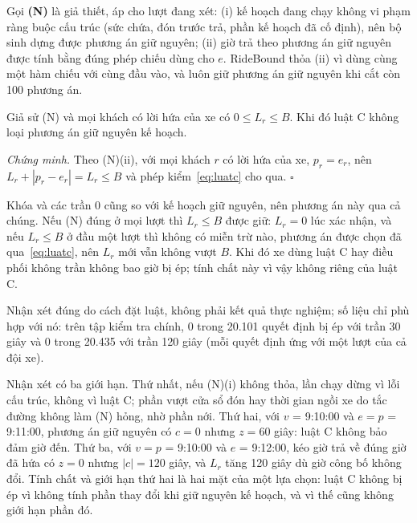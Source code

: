 Gọi \textbf{(N)} là giả thiết, áp cho lượt đang xét: (i) kế hoạch đang chạy không vi phạm ràng buộc cấu trúc
(sức chứa, đón trước trả, phần kế hoạch đã cố định), nên bộ sinh dựng được phương án giữ nguyên; (ii) giờ trả
theo phương án giữ nguyên được tính bằng đúng phép chiếu dùng cho $e$. RideBound thỏa (ii) vì dùng cùng một hàm
chiếu với cùng đầu vào, và luôn giữ phương án giữ nguyên khi cắt còn 100 phương án.

\begin{nhanxet}
\label{nx:giunguyen}
Giả sử (N) và mọi khách có lời hứa của xe có $0 \le L_r \le B$. Khi đó luật C không loại phương án giữ nguyên
kế hoạch.
\end{nhanxet}

\noindent\textit{Chứng minh.} Theo (N)(ii), với mọi khách $r$ có lời hứa của xe, $p_r = e_r$, nên
$L_r + |p_r - e_r| = L_r \le B$ và phép kiểm~\eqref{eq:luatc} cho qua. \hfill$\square$

Khóa và các trần 0 cũng so với kế hoạch giữ nguyên, nên phương án này qua cả chúng. Nếu (N) đúng ở mọi lượt thì
$L_r \le B$ được giữ: $L_r = 0$ lúc xác nhận, và nếu $L_r \le B$ ở đầu một lượt thì không có miễn trừ nào, phương
án được chọn đã qua~\eqref{eq:luatc}, nên $L_r$ mới vẫn không vượt $B$. Khi đó xe dùng luật C hay điều phối không
trần không bao giờ bị ép; tính chất này vì vậy không riêng của luật C.

Nhận xét đúng do cách đặt luật, không phải kết quả thực nghiệm; số liệu chỉ phù hợp với nó: trên tập kiểm tra
chính, 0 trong 20.101 quyết định bị ép với trần 30 giây và 0 trong 20.435 với trần 120 giây (mỗi quyết định ứng với
một lượt của cả đội xe).

Nhận xét có ba giới hạn. Thứ nhất, nếu (N)(i) không thỏa, lần chạy dừng vì lỗi cấu trúc, không vì luật C; phần
vượt cửa sổ đón hay thời gian ngồi xe do tắc đường không làm (N) hỏng, nhờ phần nới. Thứ hai, với $v$ = 9:10:00 và
$e = p$ = 9:11:00, phương án giữ nguyên có $c = 0$ nhưng $z = 60$ giây: luật C không bảo đảm giờ đến. Thứ ba, với
$v = p$ = 9:10:00 và $e$ = 9:12:00, kéo giờ trả về đúng giờ đã hứa có $z = 0$ nhưng $|c| = 120$ giây, và $L_r$
tăng 120 giây dù giờ công bố không đổi. Tính chất và giới hạn thứ hai là hai mặt của một lựa chọn: luật C không
bị ép vì không tính phần thay đổi khi giữ nguyên kế hoạch, và vì thế cũng không giới hạn phần đó.

